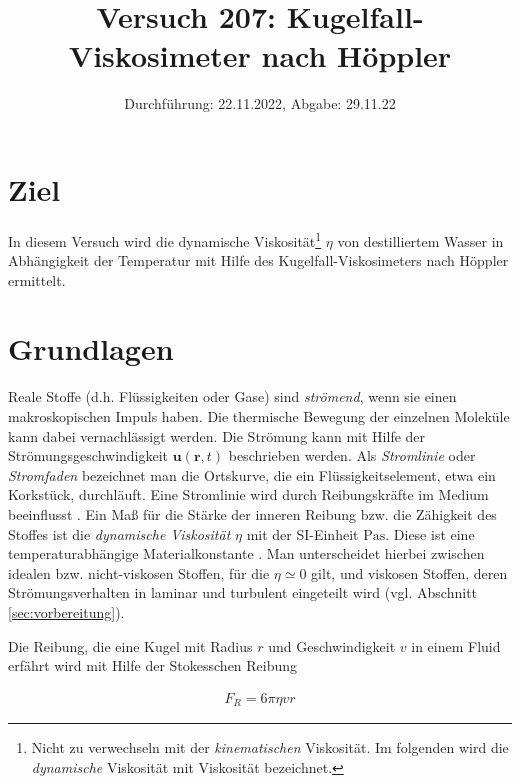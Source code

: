 

\title{Versuch 207: Kugelfall-Viskosimeter nach Höppler}
\date{Durchführung: 22.11.2022, Abgabe: 29.11.22}



\maketitle

\tableofcontents
\newpage



\section{Ziel}
In diesem Versuch wird die dynamische Viskosität\footnote{Nicht zu verwechseln mit der \textit{kinematischen} Viskosität.
Im folgenden wird die \textit{dynamische} Viskosität mit Viskosität bezeichnet.} $\eta$ 
von destilliertem Wasser in Abhängigkeit der Temperatur mit Hilfe des Kugelfall-Viskosimeters nach Höppler ermittelt.



\section{Grundlagen}
\label{sec:grundlagen}
Reale Stoffe (d.h. Flüssigkeiten oder Gase) sind \textit{strömend}, wenn sie einen makroskopischen Impuls haben.
Die thermische Bewegung der einzelnen Moleküle kann dabei vernachlässigt werden.
Die Strömung kann mit Hilfe der Strömungsgeschwindigkeit $\symbf{u}\left(\symbf{r},t\right)$ beschrieben werden.
Als \textit{Stromlinie} oder \textit{Stromfaden} bezeichnet man die Ortskurve, die ein Flüssigkeitselement, etwa ein Korkstück, durchläuft.
Eine Stromlinie wird durch Reibungskräfte im Medium beeinflusst \cite[]{demtroeder}.
Ein Maß für die Stärke der inneren Reibung bzw. die Zähigkeit des Stoffes ist die \textit{dynamische Viskosität} $\eta$ mit der SI-Einheit $\unit{\Pa \s}$.
Diese ist eine temperaturabhängige Materialkonstante \cite[]{geschke}.
Man unterscheidet hierbei zwischen idealen bzw. nicht-viskosen Stoffen, für die $\eta \simeq 0$ gilt, und viskosen Stoffen,
deren Strömungsverhalten in laminar und turbulent eingeteilt wird (vgl. Abschnitt \ref{sec:vorbereitung}).

Die Reibung, die eine Kugel mit Radius $r$ und Geschwindigkeit $v$ in einem Fluid erfährt wird mit Hilfe der Stokesschen Reibung 

\begin{align}
    F_R = 6 \pi \eta v r    
\end{align}

